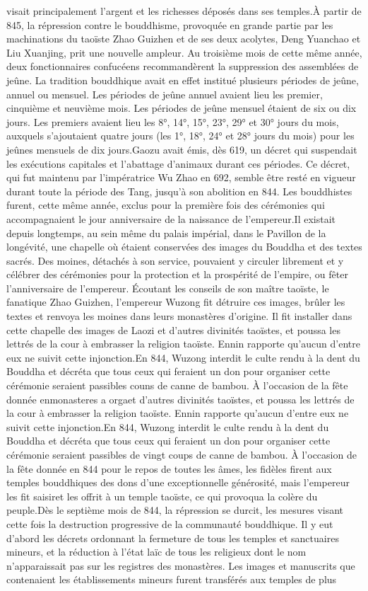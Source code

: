 visait principalement l'argent et les richesses déposés dans ses temples.À partir de 845, la répression contre le bouddhisme, provoquée en grande partie par les machinations du taoïste Zhao Guizhen et de ses deux acolytes, Deng Yuanchao et Liu Xuanjing, prit une nouvelle ampleur. Au troisième mois de cette même année, deux fonctionnaires confucéens recommandèrent la suppression des assemblées de jeûne. La tradition bouddhique avait en effet institué plusieurs périodes de jeûne, annuel ou mensuel. Les périodes de jeûne annuel avaient lieu les premier, cinquième et neuvième mois. Les périodes de jeûne mensuel étaient de six ou dix jours. Les premiers avaient lieu les 8°, 14°, 15°, 23°, 29° et 30° jours du mois, auxquels s'ajoutaient quatre jours (les 1°, 18°, 24° et 28° jours du mois) pour les jeûnes mensuels de dix jours.Gaozu avait émis, dès 619, un décret qui suspendait les exécutions capitales et l'abattage d'animaux durant ces périodes. Ce décret, qui fut maintenu par l'impératrice Wu Zhao en 692, semble être resté en vigueur durant toute la période des Tang, jusqu'à son abolition en 844. Les bouddhistes furent, cette même année, exclus pour la première fois des cérémonies qui accompagnaient le jour anniversaire de la naissance de l'empereur.Il existait depuis longtemps, au sein même du palais impérial, dans le Pavillon de la longévité, une chapelle où étaient conservées des images du Bouddha et des textes sacrés. Des moines, détachés à son service, pouvaient y circuler librement et y célébrer des cérémonies pour la protection et la prospérité de l'empire, ou fêter l'anniversaire de l'empereur. Écoutant les conseils de son maître taoïste, le fanatique Zhao Guizhen, l'empereur Wuzong fit détruire ces images, brûler les textes et renvoya les moines dans leurs monastères d'origine. Il fit installer dans cette chapelle des images de Laozi et d'autres divinités taoïstes, et poussa les lettrés de la cour à embrasser la religion taoïste. Ennin rapporte qu'aucun d'entre eux ne suivit cette injonction.En 844, Wuzong interdit le culte rendu à la dent du Bouddha et décréta que tous ceux qui feraient un don pour organiser cette cérémonie seraient passibles couns de canne de bambou. À l'occasion de la fête donnée enmonasteres a orgaet d'autres divinités taoïstes, et poussa les lettrés de la cour à embrasser la religion taoïste. Ennin rapporte qu'aucun d'entre eux ne suivit cette injonction.En 844, Wuzong interdit le culte rendu à la dent du Bouddha et décréta que tous ceux qui feraient un don pour organiser cette cérémonie seraient passibles de vingt coups de canne de bambou. À l'occasion de la fête donnée en 844 pour le repos de toutes les âmes, les fidèles firent aux temples bouddhiques des dons d'une exceptionnelle générosité, mais l'empereur les fit saisiret les offrit à un temple taoïste, ce qui provoqua la colère du peuple.Dès le septième mois de 844, la répression se durcit, les mesures visant cette fois la destruction progressive de la communauté bouddhique. Il y eut d'abord les décrets ordonnant la fermeture de tous les temples et sanctuaires mineurs, et la réduction à l'état laïc de tous les religieux dont le nom n'apparaissait pas sur les registres des monastères. Les images et manuscrits que contenaient les établissements mineurs furent transférés aux temples de plus 